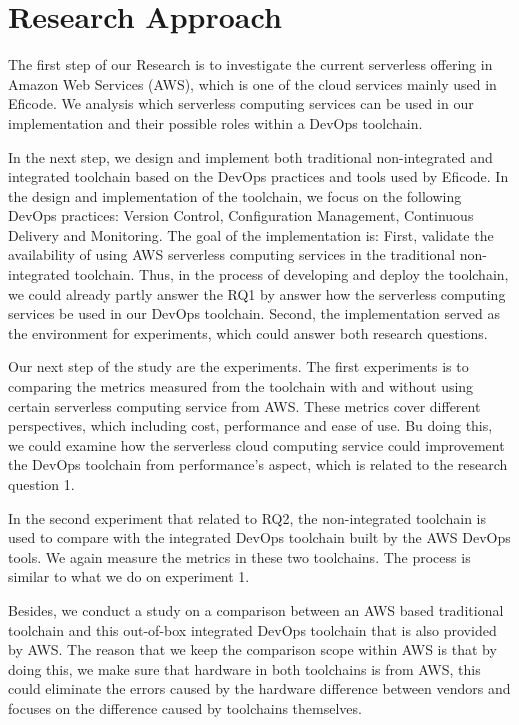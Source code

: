 \section{Research Approach} 
\par
The first step of our Research is to investigate the current serverless offering in Amazon Web Services (AWS), which is one of the cloud services mainly used in Eficode. We analysis which serverless computing services can be used in our implementation and their possible roles within a DevOps toolchain.
\par
In the next step, we design and implement both traditional non-integrated and integrated toolchain based on the DevOps practices and tools used by Eficode. In the design and implementation of the toolchain, we focus on the following DevOps practices: Version Control, Configuration Management, Continuous Delivery and Monitoring. The goal of the implementation is: First, validate the availability of using AWS serverless computing services in the traditional non-integrated toolchain. Thus, in the process of developing and deploy the toolchain, we could already partly answer the RQ1 by answer how the serverless computing services be used in our DevOps toolchain. Second, the implementation served as the environment for experiments, which could answer both research questions. 
\par
Our next step of the study are the experiments.
The first experiments is to comparing the metrics measured from the toolchain with and without using certain serverless computing service from AWS. These metrics cover different perspectives, which including cost, performance and ease of use. Bu doing this, we could examine how the serverless cloud computing service could improvement the DevOps toolchain from performance's aspect, which is related to the research question 1.
\par
In the second experiment that related to RQ2, the non-integrated toolchain is used to compare with the integrated DevOps toolchain built by the AWS DevOps tools. We again measure the metrics in these two toolchains. The process is similar to what we do on experiment 1.
\par
Besides, we conduct a study on a comparison between an AWS based traditional toolchain and this out-of-box integrated DevOps toolchain that is also provided by AWS. The reason that we keep the comparison scope within AWS is that by doing this, we make sure that hardware in both toolchains is from AWS, this could eliminate the errors caused by the hardware difference between vendors and focuses on the difference caused by toolchains themselves.

